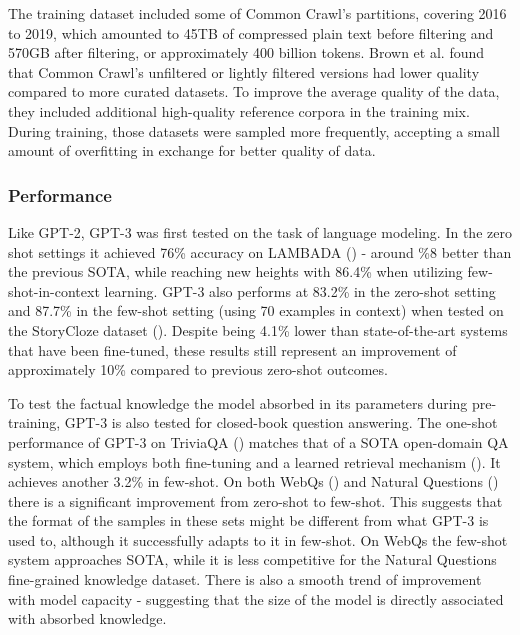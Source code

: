 \documentclass{article}
\begin{document}
\medskip
\noindent
The training dataset included some of Common Crawl's partitions, covering 2016 to 2019, which amounted to 45TB of compressed plain text before filtering and 570GB after filtering, or approximately 400 billion tokens. Brown et al. found that Common Crawl's unfiltered or lightly filtered versions had lower quality compared to more curated datasets. To improve the average quality of the data, they included additional high-quality reference corpora in the training mix. During training, those datasets were sampled more frequently, accepting a small amount of overfitting in exchange for better quality of data.


\subsubsection{Performance}
\label{subsec:gpt3-perform}

Like GPT-2, GPT-3 was first tested on the task of language modeling. In the zero shot settings it achieved 76\% accuracy on LAMBADA (\citet{paperno2016lambada}) - around \%8 better than the previous SOTA, while reaching new heights with 86.4\% when utilizing few-shot-in-context learning. GPT-3 also performs at 83.2\% in the zero-shot setting and 87.7\% in the few-shot setting (using 70 examples in context) when tested on the StoryCloze dataset (\citet{mostafazadeh2017cloze}). Despite being 4.1\% lower than state-of-the-art systems that have been fine-tuned, these results still represent an improvement of approximately 10\% compared to previous zero-shot outcomes.

\medskip
\noindent
To test the factual knowledge the model absorbed in its parameters during pre-training, GPT-3 is also tested for closed-book question answering. The one-shot performance of GPT-3 on TriviaQA (\citet{joshi2017triviaqa}) matches that of a SOTA open-domain QA system, which employs both fine-tuning and a learned retrieval mechanism (\citet{retrieval}). It achieves another 3.2\% in few-shot. On both WebQs (\citet{webqs}) and Natural Questions (\citet{kwiatkowski2019nq}) there is a significant improvement from zero-shot to few-shot. This suggests that the format of the samples in these sets might be different from what GPT-3 is used to, although it successfully adapts to it in few-shot. On WebQs the few-shot system approaches SOTA, while it is less competitive for the Natural Questions fine-grained knowledge dataset. There is also a smooth trend of improvement with model capacity - suggesting that the size of the model is directly associated with absorbed knowledge.
\end{document}
